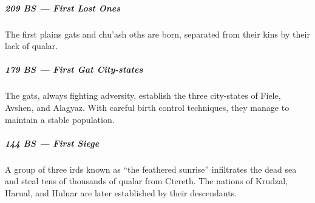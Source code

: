 \subparagraph{209 BS --- First Lost Ones} The first plains gats and chu'ash oths are born, separated from their kins by their lack of qualar.

\subparagraph{179 BS --- First Gat City-states} The gats, always fighting adversity, establish the three city-states of Fiele, Avshen, and Alagyaz.
With careful birth control techniques, they manage to maintain a stable population.

\subparagraph{144 BS --- First Siege} A group of three irds known as ``the feathered sunrise'' infiltrates the dead sea and steal tens of thousands of qualar from Ctereth.
The nations of Krudzal, Harual, and Hulnar are later established by their descendants.

